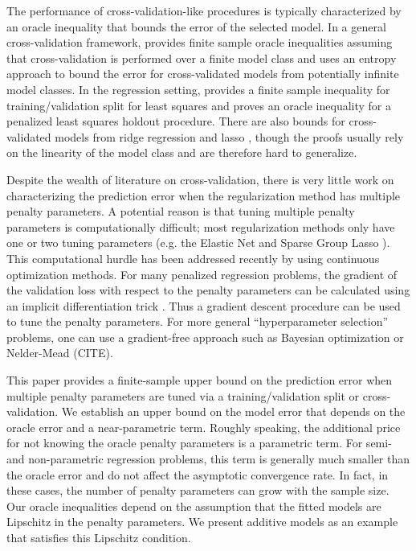 \documentclass[12pt]{article}
\begin{document}
The performance of cross-validation-like procedures is typically characterized by an oracle inequality that bounds the error of the selected model. In a general cross-validation framework, \citet{van2003unified, van2004asymptotic} provides finite sample oracle inequalities assuming that cross-validation is performed over a finite model class and \citet{lecue2012oracle} uses an entropy approach to bound the error for cross-validated models from potentially infinite model classes. In the regression setting, \citet{gyorfi2006distribution} provides a finite sample inequality for training/validation split for least squares and \citet{wegkamp2003model} proves an oracle inequality for a penalized least squares holdout procedure. There are also bounds for cross-validated models from ridge regression and lasso \citep{golub1979generalized, chetverikov2016cross, chatterjee2015prediction}, though the proofs usually rely on the linearity of the model class and are therefore hard to generalize.

Despite the wealth of literature on cross-validation, there is very little work on characterizing the prediction error when the regularization method has multiple penalty parameters. A potential reason is that tuning multiple penalty parameters is computationally difficult; most regularization methods only have one or two tuning parameters (e.g. the Elastic Net and Sparse Group Lasso \citep{zou2003regression, simon2013sparse}). This computational hurdle has been addressed recently by using continuous optimization methods. For many penalized regression problems, the gradient of the validation loss with respect to the penalty parameters can be calculated using an implicit differentiation trick \citep{bengio2000gradient, foo2008efficient}. Thus a gradient descent procedure can be used to tune the penalty parameters. For more general ``hyperparameter selection'' problems, one can use a gradient-free approach such as Bayesian optimization \citet{snoek2012practical} or Nelder-Mead (CITE).

This paper provides a finite-sample upper bound on the prediction error when multiple penalty parameters are tuned via a training/validation split or cross-validation. We establish an upper bound on the model error that depends on the oracle error and a near-parametric term. Roughly speaking, the additional price for not knowing the oracle penalty parameters is a parametric term. For semi- and non-parametric regression problems, this term is generally much smaller than the oracle error and do not affect the asymptotic convergence rate. In fact, in these cases, the number of penalty parameters can grow with the sample size. Our oracle inequalities depend on the assumption that the fitted models are Lipschitz in the penalty parameters. We present additive models as an example that satisfies this Lipschitz condition.
\end{document}
